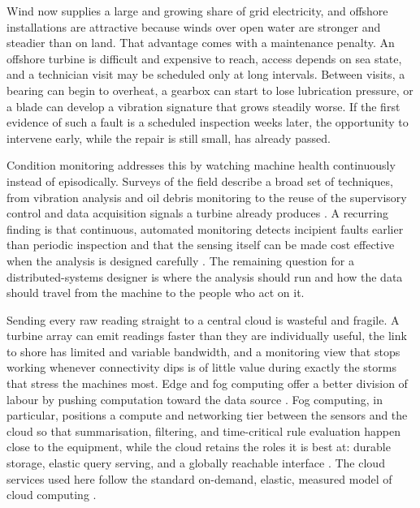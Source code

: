 \documentclass[conference]{IEEEtran}
\begin{document}
Wind now supplies a large and growing share of grid electricity, and offshore installations are attractive because winds over open water are stronger and steadier than on land. That advantage comes with a maintenance penalty. An offshore turbine is difficult and expensive to reach, access depends on sea state, and a technician visit may be scheduled only at long intervals. Between visits, a bearing can begin to overheat, a gearbox can start to lose lubrication pressure, or a blade can develop a vibration signature that grows steadily worse. If the first evidence of such a fault is a scheduled inspection weeks later, the opportunity to intervene early, while the repair is still small, has already passed.

Condition monitoring addresses this by watching machine health continuously instead of episodically. Surveys of the field describe a broad set of techniques, from vibration analysis and oil debris monitoring to the reuse of the supervisory control and data acquisition signals a turbine already produces \cite{tchakoua2014}. A recurring finding is that continuous, automated monitoring detects incipient faults earlier than periodic inspection and that the sensing itself can be made cost effective when the analysis is designed carefully \cite{yang2010}. The remaining question for a distributed-systems designer is where the analysis should run and how the data should travel from the machine to the people who act on it.

Sending every raw reading straight to a central cloud is wasteful and fragile. A turbine array can emit readings faster than they are individually useful, the link to shore has limited and variable bandwidth, and a monitoring view that stops working whenever connectivity dips is of little value during exactly the storms that stress the machines most. Edge and fog computing offer a better division of labour by pushing computation toward the data source \cite{shi2016}. Fog computing, in particular, positions a compute and networking tier between the sensors and the cloud so that summarisation, filtering, and time-critical rule evaluation happen close to the equipment, while the cloud retains the roles it is best at: durable storage, elastic query serving, and a globally reachable interface \cite{bonomi2012}. The cloud services used here follow the standard on-demand, elastic, measured model of cloud computing \cite{mell2011}.
\end{document}
